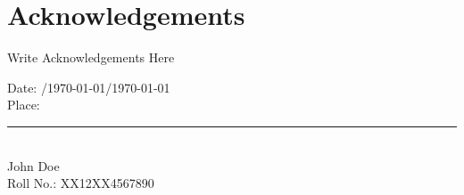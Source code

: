 
\chapter*{\centering Acknowledgements}

Write Acknowledgements Here

\vspace{4em}
\begin{minipage}[t]{0.35\textwidth}
    Date: \qquad/\thismonthdigit\today/\thisyear\today\\
    Place:
\end{minipage}%
\hfill
\begin{minipage}[t]{0.4\textwidth}
\begin{flushright}
    \bfseries
    \rule{\textwidth}{1pt}\\
	John Doe\\
	Roll No.: XX12XX4567890
\end{flushright}
\end{minipage}

\newpage
\thispagestyle{empty}
\null\newpage
